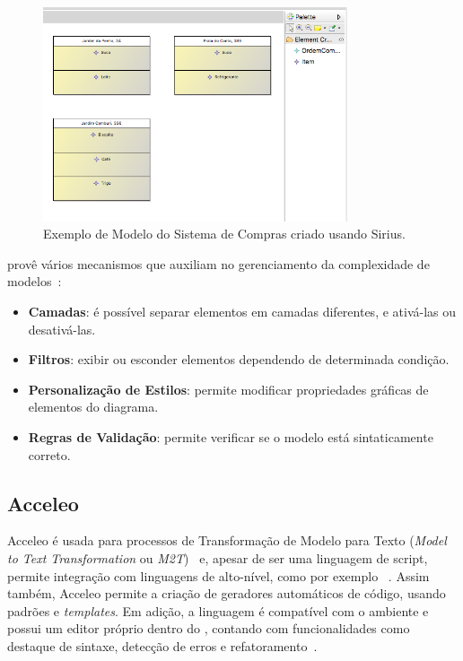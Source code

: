\begin{figure}
	\centering
	\includegraphics[width=0.8\textwidth]{figuras/exemplos-emf/exemplo-sistemacompras-modelo.png}
	\caption{Exemplo de Modelo do Sistema de Compras criado usando Sirius.}
	\label{exemplo-sistemacobrancas-sirius}
\end{figure}

\sirius provê vários mecanismos que auxiliam no gerenciamento da complexidade de modelos~\cite{madiot2015eclipse}:

\begin{itemize}
	\item \textbf{Camadas}: é possível separar elementos em camadas diferentes, e ativá-las ou desativá-las.
	\item \textbf{Filtros}: exibir ou esconder elementos dependendo de determinada condição.
	\item \textbf{Personalização de Estilos}: permite modificar propriedades gráficas de elementos do diagrama.
	\item \textbf{Regras de Validação}: permite verificar se o modelo está sintaticamente correto.
\end{itemize}

\subsection{Acceleo}

Acceleo é usada para processos de Transformação de Modelo para Texto (\textit{Model to Text Transformation} ou \textit{M2T})~\cite{acceleouserguide} e, apesar de ser uma linguagem de script, permite integração com linguagens de alto-nível, como por exemplo \java~\cite{mtsweni2012exploiting}. Assim também, Acceleo permite a criação de geradores automáticos de código, usando padrões e \textit{templates}. Em adição, a linguagem é compatível com o ambiente \eclipse e possui um editor próprio dentro do \framework, contando com funcionalidades como destaque de sintaxe, detecção de erros e refatoramento~\cite{WikiAcceleo}. 

